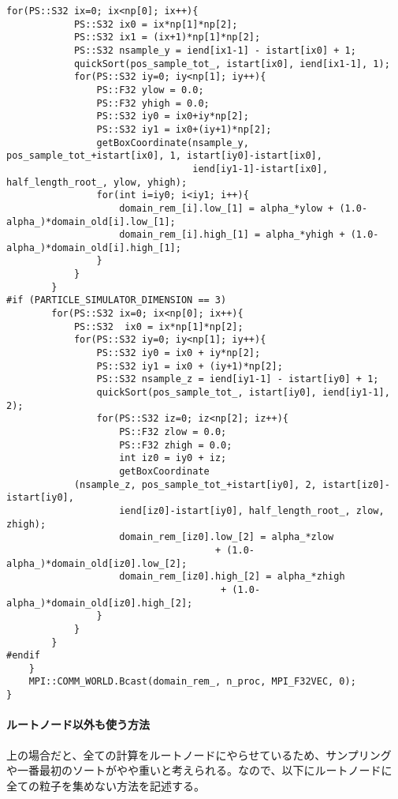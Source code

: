 \begin{lstlisting}[caption=ルートドメインの分割]
        for(PS::S32 ix=0; ix<np[0]; ix++){
            PS::S32 ix0 = ix*np[1]*np[2];
            PS::S32 ix1 = (ix+1)*np[1]*np[2];
            PS::S32 nsample_y = iend[ix1-1] - istart[ix0] + 1;
            quickSort(pos_sample_tot_, istart[ix0], iend[ix1-1], 1);
            for(PS::S32 iy=0; iy<np[1]; iy++){
                PS::F32 ylow = 0.0; 
                PS::F32 yhigh = 0.0;
                PS::S32 iy0 = ix0+iy*np[2];
                PS::S32 iy1 = ix0+(iy+1)*np[2];
                getBoxCoordinate(nsample_y, pos_sample_tot_+istart[ix0], 1, istart[iy0]-istart[ix0], 
                                 iend[iy1-1]-istart[ix0], half_length_root_, ylow, yhigh);
                for(int i=iy0; i<iy1; i++){
                    domain_rem_[i].low_[1] = alpha_*ylow + (1.0-alpha_)*domain_old[i].low_[1];
                    domain_rem_[i].high_[1] = alpha_*yhigh + (1.0-alpha_)*domain_old[i].high_[1];
                }
            }
        }
#if (PARTICLE_SIMULATOR_DIMENSION == 3)
        for(PS::S32 ix=0; ix<np[0]; ix++){
            PS::S32  ix0 = ix*np[1]*np[2];
            for(PS::S32 iy=0; iy<np[1]; iy++){
                PS::S32 iy0 = ix0 + iy*np[2];
                PS::S32 iy1 = ix0 + (iy+1)*np[2];
                PS::S32 nsample_z = iend[iy1-1] - istart[iy0] + 1;
                quickSort(pos_sample_tot_, istart[iy0], iend[iy1-1], 2);
                for(PS::S32 iz=0; iz<np[2]; iz++){
                    PS::F32 zlow = 0.0; 
                    PS::F32 zhigh = 0.0;
                    int iz0 = iy0 + iz;
                    getBoxCoordinate
		    (nsample_z, pos_sample_tot_+istart[iy0], 2, istart[iz0]-istart[iy0], 
                    iend[iz0]-istart[iy0], half_length_root_, zlow, zhigh);
                    domain_rem_[iz0].low_[2] = alpha_*zlow 
		                             + (1.0-alpha_)*domain_old[iz0].low_[2];
                    domain_rem_[iz0].high_[2] = alpha_*zhigh 
		                              + (1.0-alpha_)*domain_old[iz0].high_[2];
                }
            }
        }
#endif
    }
    MPI::COMM_WORLD.Bcast(domain_rem_, n_proc, MPI_F32VEC, 0);
}
\end{lstlisting}


\paragraph{ルートノード以外も使う方法}

上の場合だと、全ての計算をルートノードにやらせているため、サンプリング
や一番最初のソートがやや重いと考えられる。なので、以下にルートノードに
全ての粒子を集めない方法を記述する。

